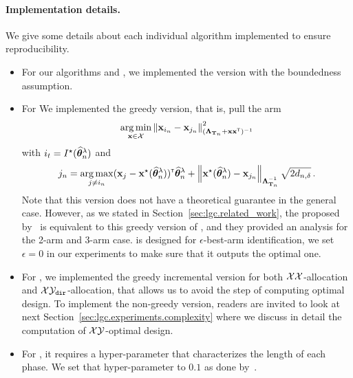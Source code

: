 \paragraph{Implementation details.}
We give some details about each individual algorithm implemented to ensure reproducibility.

\begin{itemize}
	\item For our algorithms \LG and \LGC, we implemented the version with the boundedness assumption.
	\item For \LGapE We implemented the greedy version, that is, pull the arm 
	\[
	    \operatorname*{arg\,min}_{{\bf x}\in\mathcal{X}} \left\lVert{\bf x}_{i_n}-{\bf x}_{j_n}\right\rVert_{({\boldsymbol \Lambda}_{{\bf T}_n}+{\bf x}{\bf x}^\mathsf{\scriptscriptstyle T})^{-1}}^2
	\]
	with $i_t = I^\star(\widehat{{\boldsymbol \theta}}_n^\lambda)$ and 
	\[
	    j_n = \operatorname*{arg\,max}_{j\neq i_n}({\bf x}_{j}-{\bf x}^\star(\widehat{{\boldsymbol \theta}}_n^\lambda))^\mathsf{\scriptscriptstyle T}\widehat{{\boldsymbol \theta}}_n^\lambda + \left\lVert{\bf x}^\star(\widehat{{\boldsymbol \theta}}_n^\lambda) - {\bf x}_{j_n}\right\rVert_{{\boldsymbol \Lambda}_{{\bf T}_n}^{-1}} \sqrt{2d_{n,\delta}}\,.
	\]
	Note that this version does not have a theoretical guarantee in the general case. However, as we stated in Section~\ref{sec:lgc.related_work}, the \GLUCB proposed by~\citet{zaki2019maxoverlap} is equivalent to this greedy version of \LGapE, and they provided an analysis for the 2-arm and 3-arm case. \LGapE is designed for $\epsilon$-best-arm identification, we set $\epsilon=0$ in our experiments to make sure that it outputs the optimal one.
	\item For \XYS, we implemented the greedy incremental version for both $\mathcal{X}\mathcal{X}$-allocation and $\mathcal{X}\mathcal{Y}_{\texttt{dir}}$-allocation, that allows us to avoid the step of computing optimal design. To implement the non-greedy version, readers are invited to look at next Section~\ref{sec:lgc.experiments.complexity} where we discuss in detail the computation of $\mathcal{X}\mathcal{Y}$-optimal design.
	\item For \XYA, it requires a hyper-parameter that characterizes the length of each phase. We set that hyper-parameter to $0.1$ as done by~\citet{soare2014linear}.
\end{itemize}


